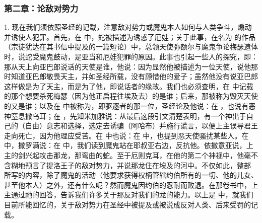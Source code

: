 
\subsubsection{第二章：论敌对势力}

1. 现在我们须依照圣经的记载，注意敌对势力或魔鬼本人如何与人类争斗，煽动并诱使人犯罪。首先，在 中，蛇被描述为诱惑了厄娃；关于此事，在名为  的作品（宗徒犹达在其书信中提及的一篇短论）中，总领天使弥额尔与魔鬼争论梅瑟遗体时，说蛇受魔鬼鼓动，是亚当和厄娃犯罪的原因。此事也引起一些人的探究，即：那从天上向亚巴郎说话的天使是谁，他说：因为显然他被描述为一位天使，说他那时知道亚巴郎敬畏天主，并如圣经所载，没有顾惜他的爱子；虽然他没有说亚巴郎这样做是为了天主，而是为了他，即说话者的缘故。我们也必须查明，在 中记载的那个想要杀死梅瑟（因为他正启程往埃及去）的是谁；后来，那被称为毁灭天使的又是谁；以及在 中被称为，即驱逐者的那一位，圣经论及他说：在 ，也说有恶神窒息撒乌耳；在 ，先知米加雅说：从最后这段引文清楚表明，有一个神出于自己的（自由）意志和选择，选定去诱骗（阿哈布）并施行谎言，以便上主误导君王走向死亡，因为他理应受苦。在 中也说：在 中，也提到恶天使骚扰某些人。在 中，撒罗满说：在 中，我们读到魔鬼站在耶叔亚右边，反抗他。依撒意亚说，上主的剑兴起攻击那龙，那弯曲的蛇。至于厄则克耳，在他的第二个神视中，他毫不含糊地预言了提洛王子的敌对势力，并说那龙住在埃及的河中。不仅如此，整部 所写的内容，除了魔鬼的活动（他要求获得权柄管辖约伯所有的一切、他的儿女、甚至他本人）之外，还有什么呢？然而魔鬼因约伯的忍耐而败退。在那卷书中，上主通过祂的回答，告诉我们许多关于那反对我们的龙的能力。以上是 中，就我们目前所能回忆的，关于敌对势力在圣经中被提及或被说成反对人类、后来受罚的记载。\par

